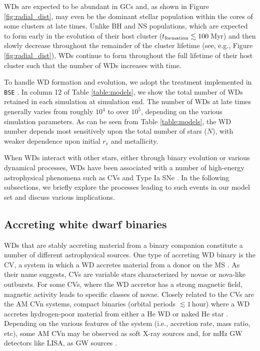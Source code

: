 \documentclass[twocolumn,tighten]{aastex63}
\begin{document}
WDs are expected to be abundant in GCs and, as shown in Figure \ref{fig:radial_dist}, may even be the dominant stellar population within the cores of some clusters at late times. Unlike BH and NS populations, which are expected to form early in the evolution of their host cluster ($t_{\rm{formation}} \lesssim 100\,$Myr) and then slowly decrease throughout the remainder of the cluster lifetime (see, e.g., Figure \ref{fig:radial_dist}), WDs continue to form throughout the full lifetime of their host cluster such that the number of WDs increases with time.

To handle WD formation and evolution, we adopt the treatment implemented in \texttt{BSE} \citep[for details, we direct the reader to][]{Hurley2002}. In column 12 of Table \ref{table:models}, we show the total number of WDs retained in each simulation at simulation end. The number of WDs at late times generally varies from roughly $10^4$ to over $10^5$, depending on the various simulation parameters. As can be seen from Table \ref{table:models}, the WD number depends most sensitively upon the total number of stars ($N$), with weaker dependence upon initial $r_v$ and metallicity.

When WDs interact with other stars, either through binary evolution or various dynamical processes, WDs have been associated with a number of high-energy astrophysical phenomena such as CVs \citep{Knigge2012,Ivanova2006} and Type Ia SNe \citep[e.g.,][]{SharaHurley2002}. In the following subsections, we briefly explore the processes leading to such events in our model set and discuss various implications.

\subsection{Accreting white dwarf binaries}
\label{sec:accreting_WDs}

WDs that are stably accreting material from a binary companion constitute a number of different astrophysical sources. One type of accreting WD binary is the CV, a system in which a WD accretes material from a donor on the MS \citep[e.g.,][]{Warner1995,Knigge2011}. As their name suggests, CVs are variable stars characterized by novae or nova-like outbursts. For some CVs, where the WD accretor has a strong magnetic field, magnetic activity leads to specific classes of novae. Closely related to the CVs are the AM CVn systems, compact binaries (orbital periods $\lesssim 1\,$hour) where a WD accretes hydrogen-poor material from either a He WD or naked He star \citep[e.g.,][]{Paczynski1967,Marsh2004,Nelemans2005}. Depending on the various features of the system (i.e., accretion rate, mass ratio, etc), some AM CVn may be observed as soft X-ray sources \citep[e.g.,][]{Nelemans2004} and, for mHz GW detectors like LISA, as GW sources \citep[e.g.,][]{Nelemans2004,Kremer2017}. 
\end{document}
